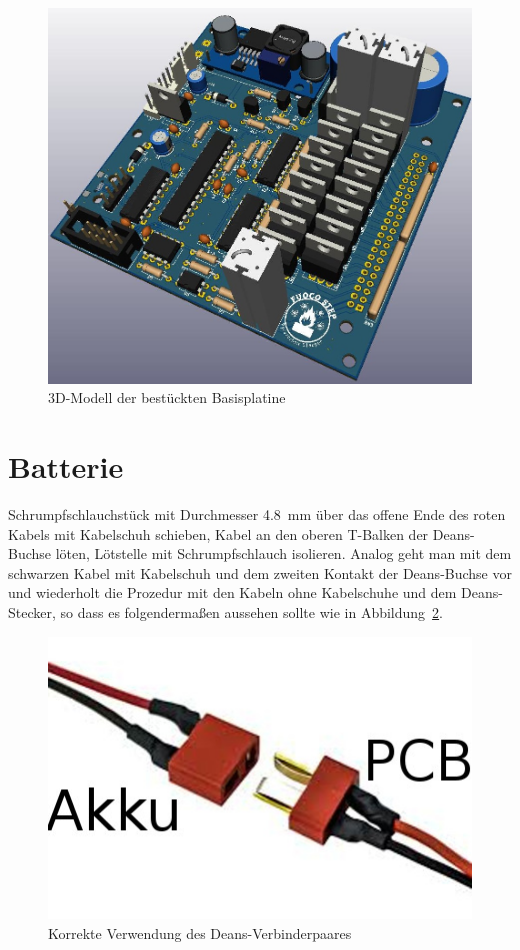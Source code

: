 \documentclass[paper=a4, open=any]{scrbook}
\begin{document}
				\begin{figure}
					\centering\includegraphics[width=\textwidth]{base3d}
					\caption{3D-Modell der bestückten Basisplatine}
					\label{fig:base3d}
				\end{figure}


		\section{Batterie}

			Schrumpfschlauchstück mit Durchmesser \SI{4,8}{\milli\metre} über das offene Ende des roten Kabels mit Kabelschuh schieben, Kabel an den oberen T-Balken der Deans-Buchse löten, Lötstelle mit Schrumpfschlauch isolieren. Analog geht man mit dem schwarzen Kabel mit Kabelschuh und dem zweiten Kontakt der Deans-Buchse vor und wiederholt die Prozedur mit den Kabeln ohne Kabelschuhe und dem Deans-Stecker, so dass es folgendermaßen aussehen sollte wie in Abbildung~\ref{fig:deans}.
			
			\begin{figure}
				\centering\includegraphics[width=.4\textwidth]{deans}
				\caption{Korrekte Verwendung des Deans-Verbinder\-paares}
				\label{fig:deans}
			\end{figure}
\end{document}

